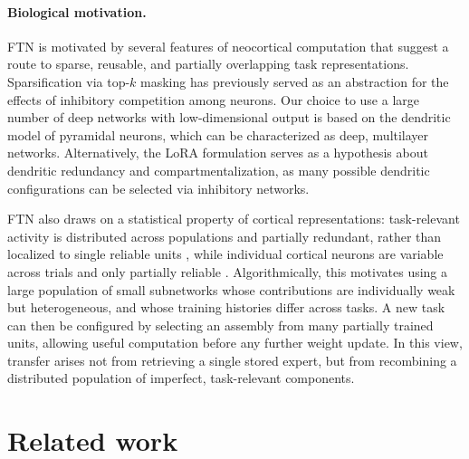 \documentclass[11pt]{article}
\begin{document}
\paragraph{Biological motivation.}
FTN is motivated by several features of neocortical computation that suggest a route to sparse, reusable, and partially overlapping task representations. Sparsification via top-$k$ masking has previously served as an abstraction for the effects of inhibitory competition among neurons\citep{yang2019task,cichon2015branch,mongillo2018inhibitory,rolls2010attractor,khona2022attractor,amari1977dynamics,maass2000computational,douglas2004neuronal}. Our choice to use a large number of deep networks with low-dimensional output is based on the dendritic model of pyramidal neurons, which can be characterized as deep, multilayer networks\citep{poirazi2003pyramidal,poirazi2020illuminating,beniaguev2021single}.
Alternatively, the LoRA formulation serves as a hypothesis about dendritic redundancy and compartmentalization, as many possible dendritic configurations can be selected via inhibitory networks. 

FTN also draws on a statistical property of cortical representations: task-relevant activity is distributed across populations and partially redundant, rather than localized to single reliable units \citep{georgopoulos1986neuronal,averbeck2006neural,cohen2011measuring}, while individual cortical neurons are variable across trials and only partially reliable \citep{tolhurst1983statistical,softky1993highly,shadlen1998variable,faisal2008noise,churchland2010stimulus,goris2014partitioning}. Algorithmically, this motivates using a large population of small subnetworks whose contributions are individually weak but heterogeneous, and whose training histories differ across tasks. A new task can then be configured by selecting an assembly from many partially trained units, allowing useful computation before any further weight update. In this view, transfer arises not from retrieving a single stored expert, but from recombining a distributed population of imperfect, task-relevant components.

\section{Related work}\label{sec:related}

\end{document}
